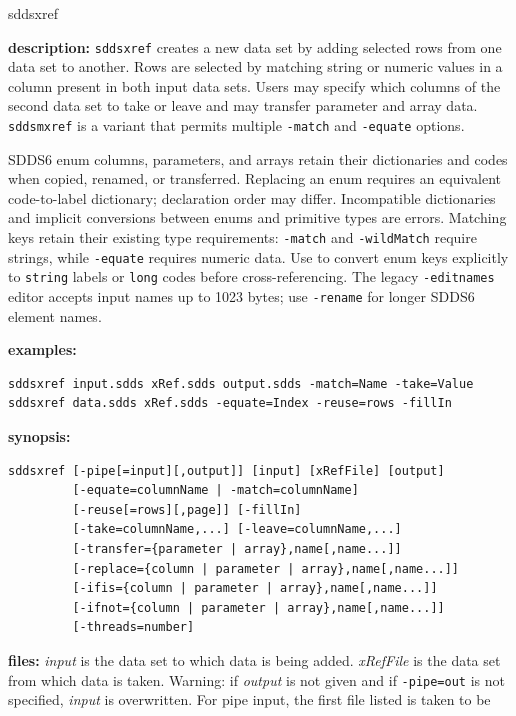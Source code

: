 \begin{sddsprog}{sddsxref}
  \item \textbf{description:}
  \verb|sddsxref| creates a new data set by adding selected rows from one data set to another.
  Rows are selected by matching string or numeric values in a column present in both input data sets.
  Users may specify which columns of the second data set to take or leave and may transfer
  parameter and array data. \verb|sddsmxref| is a variant that permits multiple \verb|-match|
  and \verb|-equate| options.

  SDDS6 enum columns, parameters, and arrays retain their dictionaries and codes when
  copied, renamed, or transferred. Replacing an enum requires an equivalent code-to-label
  dictionary; declaration order may differ. Incompatible dictionaries and implicit conversions
  between enums and primitive types are errors. Matching keys retain their existing type
  requirements: \verb|-match| and \verb|-wildMatch| require strings, while \verb|-equate|
  requires numeric data. Use  to convert enum keys explicitly to
  \verb|string| labels or \verb|long| codes before cross-referencing.
  The legacy \verb|-editnames| editor accepts input names up to 1023 bytes;
  use \verb|-rename| for longer SDDS6 element names.
  \item \textbf{examples:}
    \begin{verbatim}
sddsxref input.sdds xRef.sdds output.sdds -match=Name -take=Value
sddsxref data.sdds xRef.sdds -equate=Index -reuse=rows -fillIn
    \end{verbatim}
  \item \textbf{synopsis:}
    \begin{verbatim}
sddsxref [-pipe[=input][,output]] [input] [xRefFile] [output]
         [-equate=columnName | -match=columnName]
         [-reuse[=rows][,page]] [-fillIn]
         [-take=columnName,...] [-leave=columnName,...]
         [-transfer={parameter | array},name[,name...]]
         [-replace={column | parameter | array},name[,name...]]
         [-ifis={column | parameter | array},name[,name...]]
         [-ifnot={column | parameter | array},name[,name...]]
         [-threads=number]
    \end{verbatim}
  \item \textbf{files:}
    \emph{input} is the data set to which data is being added. \emph{xRefFile} is the data set from
    which data is taken. Warning: if \emph{output} is not given and if \verb|-pipe=out| is not
    specified, \emph{input} is overwritten. For pipe input, the first file listed is taken to be

\end{sddsprog}
